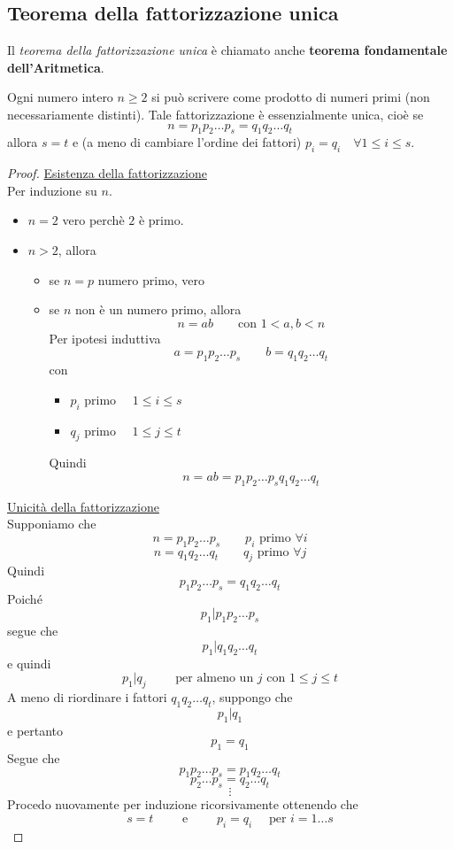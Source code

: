 \documentclass[a4paper,12pt, oneside]{book}
\begin{document}
		\subsection{Teorema della fattorizzazione unica}
			Il \textit{teorema della fattorizzazione unica} è chiamato anche \textbf{teorema fondamentale dell'Aritmetica}.
			\begin{teorema}
				Ogni numero intero $n \geq 2$ si può scrivere come prodotto di numeri primi (non necessariamente distinti).
				Tale fattorizzazione è essenzialmente unica, cioè se
				$$n = p_1 p_2 \dots p_s = q_1 q_2 \dots q_t$$
				allora $s=t$ e (a meno di cambiare l'ordine dei fattori) $p_i = q_i \quad \forall 1 \leq i \leq s$.
				
				\begin{proof}
					\underline{Esistenza della fattorizzazione}\\
						Per induzione su $n$.
						\begin{itemize}
							\item $n=2$ vero perchè $2$ è primo.
							\item $n>2$, allora \begin{itemize}
								\item se $n=p$ numero primo, vero
								\item se $n$ non è un numero primo, allora
									$$n=ab \qquad \mbox{con } 1 < a,b < n$$
									Per ipotesi induttiva 
									$$a=p_1p_2 \dots p_s \qquad b = q_1q_2 \dots q_t$$
									con \begin{itemize}
										\item $p_i \mbox{ primo } \quad 1 \leq i \leq s$
										\item $q_j \mbox{ primo } \quad 1 \leq j \leq t$
									\end{itemize}
									Quindi
									$$n = ab = p_1 p_2 \dots p_s q_1 q_2 \dots q_t$$
							\end{itemize}
						\end{itemize}
					\underline{Unicità della fattorizzazione}\\
						Supponiamo che
						$$n = p_1p_2 \dots p_s \qquad p_i \mbox{ primo } \forall i$$
						$$n = q_1q_2 \dots q_t \qquad q_j \mbox{ primo } \forall j$$
						Quindi
						$$p_1p_2 \dots p_s = q_1q_2 \dots q_t$$
						Poiché
						$$p_1 | p_1 p_2 \dots p_s$$
						segue che 
						$$p_1 | q_1 q_2 \dots q_t$$
						e quindi 
						$$p_1 | q_j \qquad \mbox{ per almeno un } j \mbox{ con } 1 \leq j \leq t$$
						A meno di riordinare i fattori $q_1q_2 \dots q_t$, suppongo che
						$$p_1 | q_1$$ e pertanto $$p_1 = q_1$$
						Segue che
						$$p_1 p_2 \dots p_s = p_1 q_2 \dots q_t$$
						$$p_2 \dots p_s = q_2 \dots q_t$$
						$$\vdots$$
						Procedo nuovamente per induzione ricorsivamente ottenendo che
						$$s=t \qquad \mbox{ e } \qquad p_i = q_i \quad \mbox{ per } i = 1 \dots s$$
						
				\end{proof}
			\end{teorema}
		
\end{document}

